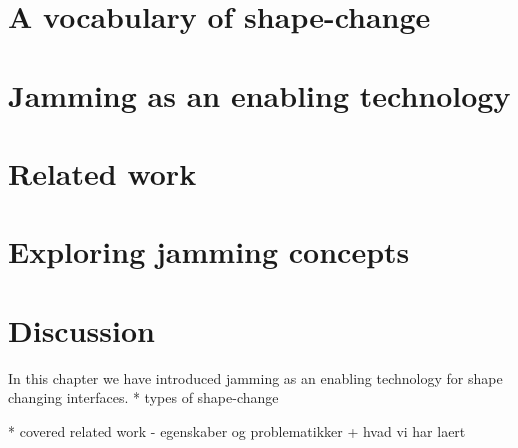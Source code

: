 \section{A vocabulary of shape-change}
\label{ch:jamming:shape-change} 


\section{Jamming as an enabling technology}
\label{ch:jamming:enabling-technology} 


\section{Related work}
\label{ch:jamming:related-work} 


\section{Exploring jamming concepts}
\label{ch:jamming:concepts} 


\section{Discussion}

In this chapter we have introduced jamming as an enabling technology for shape changing interfaces.
* types of shape-change

* covered related work - egenskaber og problematikker + hvad vi har laert



